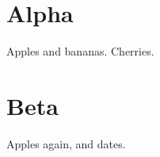 \documentclass{article}
\begin{document}
\section{Alpha}
Apples and bananas. Cherries.

\newpage
\section{Beta}
Apples again, and dates.
\printindex
\end{document}
